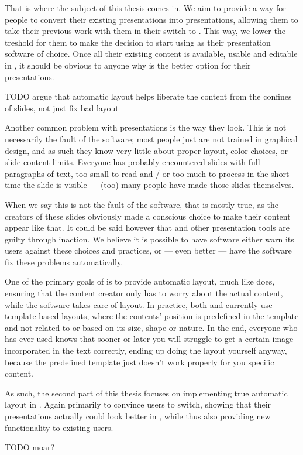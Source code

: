   That is where the subject of this thesis comes in. We aim to provide a way
  for people to convert their existing \ppt presentations into \mxp
  presentations, allowing them to take their previous work with them in their
  switch to \mxp. This way, we lower the treshold for them to make the decision
  to start using \mxp as their presentation software of choice. Once all their
  existing \ppt content is available, usable and editable in \mxp, it should be
  obvious to anyone why \mxp is the better option for their presentations.

  TODO argue that automatic layout helps liberate the content from the confines
  of slides, not just fix bad layout

  Another common problem with \ppt presentations is the way they look. This is
  not necessarily the fault of the software; most people just are not trained
  in graphical design, and as such they know very little about proper layout,
  color choices, or slide content limits. Everyone has probably encountered
  slides with full paragraphs of text, too small to read and / or too much to
  process in the short time the slide is visible --- (too) many people have
  made those slides themselves.

  When we say this is not the fault of the software, that is mostly true, as
  the creators of these slides obviously made a conscious choice to make their
  content appear like that. It could be said however that \ppt* and other
  presentation tools are guilty through inaction. We believe it is possible to
  have software either warn its users against these choices and practices, or
  --- even better --- have the software fix these problems automatically.

  One of the primary goals of \mxp is to provide automatic layout, much like
  \latex does, ensuring that the content creator only has to worry about the
  actual content, while the software takes care of layout. In practice, both
  \latex and \mxp currently use template-based layouts, where the contents'
  position is predefined in the template and not related to or based on its
  size, shape or nature. In the end, everyone who has ever used \latex knows
  that sooner or later you will struggle to get a certain image incorporated in
  the text correctly, ending up doing the layout yourself anyway, because the
  predefined template just doesn't work properly for you specific content.

  As such, the second part of this thesis focuses on implementing true
  automatic layout in \mxp. Again primarily to convince \ppt* users to switch,
  showing that their presentations actually could look better in \mxp, while
  thus also providing new functionality to existing \mxp users.

  TODO moar?
